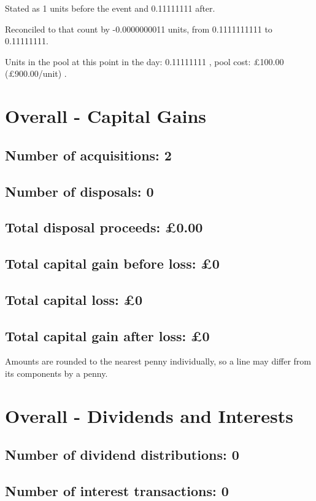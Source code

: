 \documentclass{article}
\begin{document}
Stated as 1 units before the event and 0.11111111 after.

Reconciled to that count by -0.0000000011 units, from 0.1111111111 to 0.11111111.

Units in the pool at this point in the day: 0.11111111%
,
    pool cost: £100.00
    (£900.00/unit)%
.





\clearpage
\section*{Overall - Capital Gains}
\subsection*{Number of acquisitions: 2}
\subsection*{Number of disposals: 0}
\subsection*{Total disposal proceeds: £0.00}
\subsection*{Total capital gain before loss: £0}
\subsection*{Total capital loss: £0}
\subsection*{Total capital gain after loss: £0}
\vspace{1em}
Amounts are rounded to the nearest penny individually, so a line may differ from its components by a penny.
\vspace{2em}
\section*{Overall - Dividends and Interests}
\subsection*{Number of dividend distributions: 0}
\subsection*{Number of interest transactions: 0}
\end{document}
